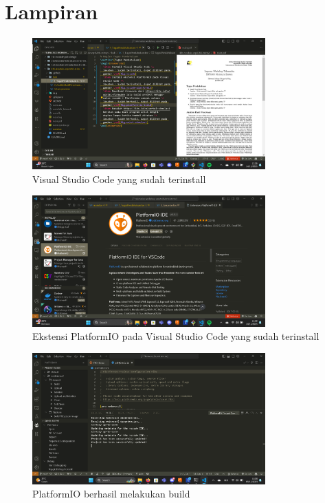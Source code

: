 \section*{Lampiran} %

\begin{figure}[H]
  \centering
  \includegraphics[width=0.8\textwidth]{img/vscode-install.png}
  \caption{Visual Studio Code yang sudah terinstall}
  \label{fig:vscode}
\end{figure}

\begin{figure}[H]
  \centering
  \includegraphics[width=0.8\textwidth]{img/platformio.png}
  \caption{Ekstensi PlatformIO pada Visual Studio Code yang sudah terinstall}
  \label{fig:vscode-platformio}
\end{figure}

\begin{figure}[H]
  \centering
  \includegraphics[width=0.8\textwidth]{img/platformio-build.png}
  \caption{PlatformIO berhasil melakukan build}
  \label{fig:platform-io-build}
\end{figure}

